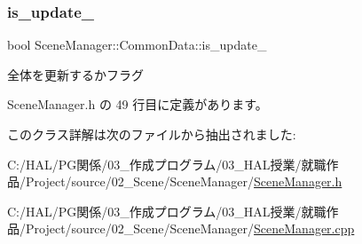 \subsubsection{\texorpdfstring{is\+\_\+update\+\_\+}{is\_update\_}}
{\footnotesize\ttfamily bool Scene\+Manager\+::\+Common\+Data\+::is\+\_\+update\+\_\+\hspace{0.3cm}{\ttfamily [private]}}



全体を更新するかフラグ 



 Scene\+Manager.\+h の 49 行目に定義があります。



このクラス詳解は次のファイルから抽出されました\+:\begin{DoxyCompactItemize}
\item 
C\+:/\+H\+A\+L/\+P\+G関係/03\+\_\+作成プログラム/03\+\_\+\+H\+A\+L授業/就職作品/\+Project/source/02\+\_\+\+Scene/\+Scene\+Manager/\mbox{\hyperlink{_scene_manager_8h}{Scene\+Manager.\+h}}\item 
C\+:/\+H\+A\+L/\+P\+G関係/03\+\_\+作成プログラム/03\+\_\+\+H\+A\+L授業/就職作品/\+Project/source/02\+\_\+\+Scene/\+Scene\+Manager/\mbox{\hyperlink{_scene_manager_8cpp}{Scene\+Manager.\+cpp}}\end{DoxyCompactItemize}
